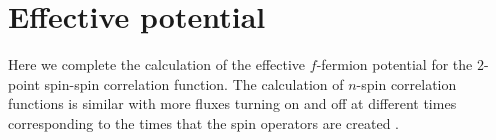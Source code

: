 \documentclass[aps,pra,preprint,groupedaddress]{revtex4-1}
\newcommand{\1}{\mathds{1}}
\begin{document}

\section{Effective potential}


Here we complete the calculation of the effective $f$-fermion potential for the $2$-point spin-spin correlation function. The calculation of $n$-spin correlation functions is similar with more fluxes turning on and off at different times corresponding to the times that the spin operators are created \cite{Tikhonov}. 
\end{document}
